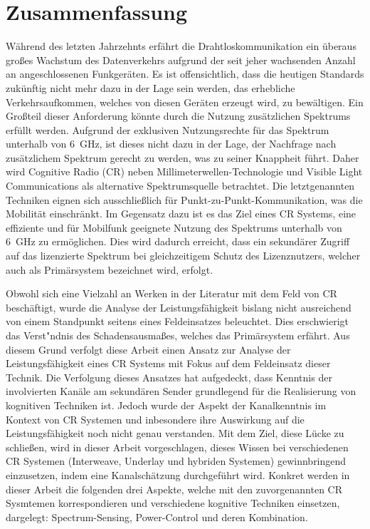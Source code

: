 \chapter*{Zusammenfassung}
W\"ahrend des letzten Jahrzehnts erf\"ahrt die Drahtloskommunikation ein \"uberaus gro\ss es Wachstum des Datenverkehrs aufgrund der seit jeher wachsenden Anzahl an angeschlossenen Funkger\"aten. Es ist offensichtlich, dass die heutigen Standards zuk\"unftig nicht mehr dazu in der Lage sein werden, das erhebliche Verkehrsaufkommen, welches von diesen Ger\"aten erzeugt wird, zu bew\"altigen. Ein Gro\ss teil dieser Anforderung k\"onnte durch die Nutzung zus\"atzlichen Spektrums erf\"ullt werden. Aufgrund der exklusiven Nutzungsrechte f\"ur das Spektrum unterhalb von \SI{6}{GHz}, ist dieses nicht dazu in der Lage, der Nachfrage nach zus\"atzlichem Spektrum gerecht zu werden, was zu seiner Knappheit f\"uhrt. Daher wird Cognitive Radio (CR) neben Millimeterwellen-Technologie und Visible Light Communications als alternative Spektrumsquelle betrachtet. Die letztgenannten Techniken eignen sich ausschlie\ss lich f\"ur Punkt-zu-Punkt-Kommunikation, was die Mobilit\"at einschr\"ankt. Im Gegensatz dazu ist es das Ziel eines CR Systems, eine effiziente und f\"ur Mobilfunk geeignete Nutzung des Spektrums unterhalb von \SI{6}{GHz} zu erm\"oglichen. Dies wird dadurch erreicht, dass ein sekund\"arer Zugriff auf das lizenzierte Spektrum bei gleichzeitigem Schutz des Lizenznutzers, welcher auch als Prim\"arsystem bezeichnet wird, erfolgt. 

Obwohl sich eine Vielzahl an Werken in der Literatur mit dem Feld von CR besch\"aftigt, wurde die Analyse der Leistungsf\"ahigkeit bislang nicht ausreichend von einem Standpunkt seitens eines Feldeinsatzes beleuchtet. Dies erschwierigt das Verst\a"ndnis des Schadensausma\ss es, welches das Prim\"arsystem erf\"ahrt. Aus diesem Grund verfolgt diese Arbeit einen Ansatz zur Analyse der Leistungsf\"ahigkeit eines CR Systems mit Fokus auf dem Feldeinsatz dieser Technik. Die Verfolgung dieses Ansatzes hat aufgedeckt, dass Kenntnis der involvierten Kan\"ale am sekund\"aren Sender grundlegend f\"ur die Realisierung von kognitiven Techniken ist. Jedoch wurde der Aspekt der Kanalkenntnis im Kontext von CR Systemen und inbesondere ihre Auswirkung auf die Leistungsf\"ahigkeit noch nicht genau verstanden. Mit dem Ziel, diese L\"ucke zu schlie\ss en, wird in dieser Arbeit vorgeschlagen, dieses Wissen bei verschiedenen CR Systemen (Interweave, Underlay und hybriden Systemen) gewinnbringend einzusetzen, indem eine Kanalsch\"atzung durchgef\"uhrt wird. Konkret werden in dieser Arbeit die folgenden drei Aspekte, welche mit den zuvorgenannten CR Sysmtemen korrespondieren und verschiedene kognitive Techniken einsetzen, dargelegt: Spectrum-Sensing, Power-Control und deren Kombination.

